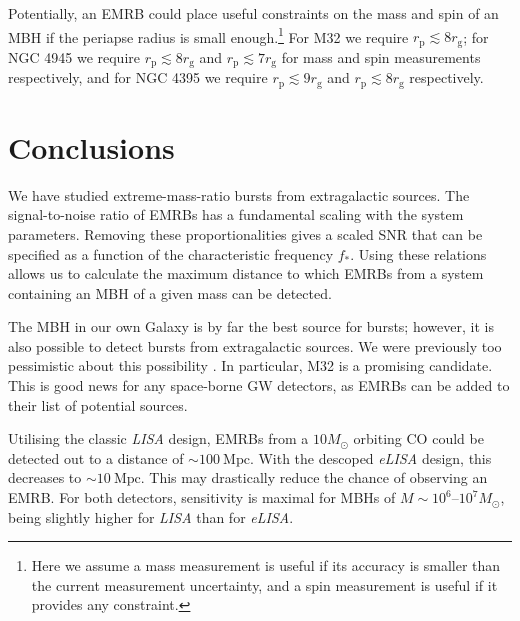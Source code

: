 \documentclass[useAMS,usedcolumn,usegraphicx,usenatbib]{mn2e}
\newcommand{\units}[1]{\ensuremath{~\mathrm{#1}}}
\newcommand{\sub}[1]{\ensuremath{_\mathrm{#1}}}
\begin{document}
Potentially, an EMRB could place useful constraints on the mass and spin of an MBH if the periapse radius is small enough.\footnote{Here we assume a mass measurement is useful if its accuracy is smaller than the current measurement uncertainty, and a spin measurement is useful if it provides any constraint.} For M32 we require $r\sub{p} \lesssim 8 r\sub{g}$; for NGC 4945 we require $r\sub{p} \lesssim 8 r\sub{g}$ and $r\sub{p} \lesssim 7 r\sub{g}$ for mass and spin measurements respectively, and for NGC 4395 we require $r\sub{p} \lesssim 9 r\sub{g}$ and $r\sub{p} \lesssim 8 r\sub{g}$ respectively.

\section{Conclusions}\label{sec:End}

We have studied extreme-mass-ratio bursts from extragalactic sources. The signal-to-noise ratio of EMRBs has a fundamental scaling with the system parameters. Removing these proportionalities gives a scaled SNR that can be specified as a function of the characteristic frequency $f_\ast$. Using these relations allows us to calculate the maximum distance to which EMRBs from a system containing an MBH of a given mass can be detected.

The MBH in our own Galaxy is by far the best source for bursts; however, it is also possible to detect bursts from extragalactic sources. We were previously too pessimistic about this possibility \citep{Berry2013}. In particular, M32 is a promising candidate. This is good news for any space-borne GW detectors, as EMRBs can be added to their list of potential sources.

Utilising the classic \textit{LISA} design, EMRBs from a $10 M_\odot$ orbiting CO could be detected out to a distance of $\sim 100\units{Mpc}$. With the descoped \textit{eLISA} design, this decreases to $\sim 10\units{Mpc}$. This may drastically reduce the chance of observing an EMRB. For both detectors, sensitivity is maximal for MBHs of $M \sim 10^6$--$10^7 M_\odot$, being slightly higher for \textit{LISA} than for \textit{eLISA}.
\end{document}
